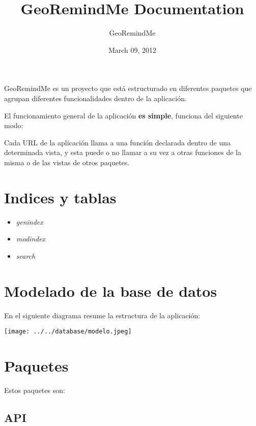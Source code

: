 \documentclass[letterpaper,10pt,english]{sphinxmanual}
\title{GeoRemindMe Documentation}
\date{March 09, 2012}
\author{GeoRemindMe}
\begin{document}
\maketitle
\tableofcontents
{}\label{index::doc}


GeoRemindMe es un proyecto que está estructurado en diferentes paquetes
que agrupan diferentes funcionalidades dentro de la aplicación.

El funcionamiento general de la aplicación \textbf{es simple}, funciona del
siguiente modo:

Cada URL de la aplicación llama a una función declarada dentro de una
determinada vista, y esta puede o no llamar a su vez a otras funciones
de la misma o de las vistas de otros paquetes.


\chapter{Indices y tablas}
\label{index:indices-y-tablas}\label{index:documentacion-de-georemindme-webapp}\begin{itemize}
\item {} 
\emph{genindex}

\item {} 
\emph{modindex}

\item {} 
\emph{search}

\end{itemize}


\chapter{Modelado de la base de datos}
\label{index:modelado-de-la-base-de-datos}
En el siguiente diagrama resume la estructura de la aplicación:

{\hfill\texttt{[image: ../../database/modelo.jpeg]}\hfill}


\chapter{Paquetes}
\label{index:paquetes}
Estos paquetes son:


\section{API}
\label{api:module-apps.api.views}\label{api:api}\label{api::doc}\label{api:module-webapp.apps.api.views}
\end{document}
